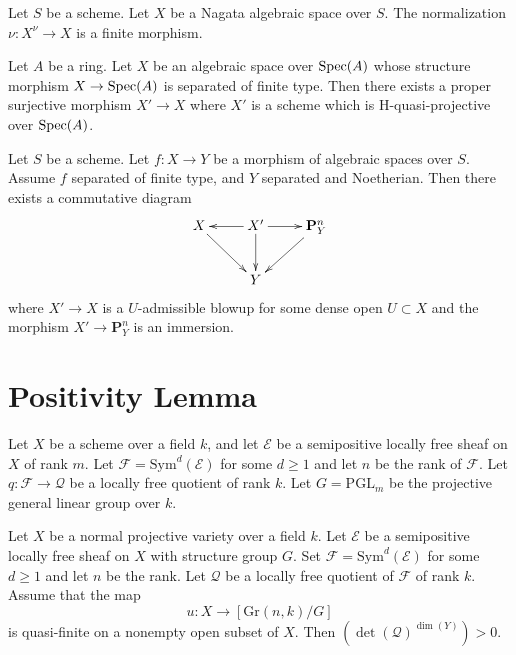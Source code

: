 \begin{lemma}
\label{lemma-nagata-normalization}
Let $S$ be a scheme. Let $X$ be a Nagata algebraic space over $S$.
The normalization $\nu : X^\nu \to X$ is a finite morphism.
\end{lemma}

\begin{lemma}
\label{lemma-weak-chow}
Let $A$ be a ring. Let $X$ be an algebraic space over $\mathop{\rm Spec}(A)$
whose structure morphism $X \to \mathop{\rm Spec}(A)$ is separated of finite type.
Then there exists a proper surjective morphism $X' \to X$
where $X'$ is a scheme which is H-quasi-projective over $\mathop{\rm Spec}(A)$.
\end{lemma}

\begin{lemma}
\label{lemma-chow-noetherian-separated}
\begin{reference}
\cite[IV Theorem 3.1]{Kn}
\end{reference}
Let $S$ be a scheme. Let $f : X \to Y$ be a morphism of algebraic spaces
over $S$. Assume $f$ separated of finite type, and $Y$ separated and
Noetherian. Then there exists a commutative diagram
$$
\xymatrix{
X \ar[rd] & X' \ar[l] \ar[d] \ar[r] & \mathbf{P}^n_Y \ar[ld] \\
& Y
}
$$
where $X' \to X$ is a $U$-admissible blowup for some dense open
$U \subset X$ and the morphism $X' \to \mathbf{P}^n_Y$ is an immersion.
\end{lemma}

\section{Positivity Lemma}

\begin{definition}
Let $X$ be a scheme over a field $k$, and let $\mathcal{E}$ be a semipositive
locally free sheaf on $X$ of rank $m$.
Let $\mathcal{F} = \mathrm{Sym}^d(\mathcal{E})$ for some $d \geq 1$ and let $n$
be the rank of $\mathcal{F}$.
Let $q\colon \mathcal{F} \to \mathcal{Q}$ be a locally free quotient of rank $k$. 
Let $G = \mathrm{PGL}_m$ be the projective general linear group over $k$.
\end{definition}

\begin{lemma}
\label{lemma-positive-self-intersection}
Let $X$ be a normal projective variety over a field $k$.
Let $\mathcal{E}$ be a semipositive locally free sheaf on $X$ with structure
group $G$.
Set $\mathcal{F} = \mathrm{Sym}^d(\mathcal{E})$ for some $d \geq 1$ and let $n$
be the rank.
Let $\mathcal{Q}$ be a locally free quotient of $\mathcal{F}$ of rank $k$.
Assume that the map
$$
u : X \to [\mathrm{Gr}(n,k)/G]
$$
is quasi-finite on a nonempty open subset of $X$.
Then $(\det(\mathcal{Q})^{\dim(Y)}) > 0$.
\end{lemma}

